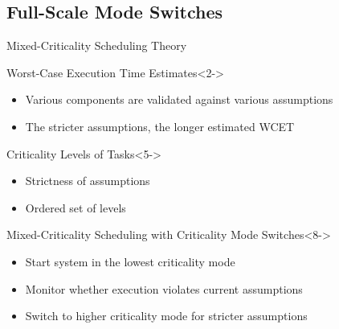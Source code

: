 \subsection{Full-Scale Mode Switches}

\begin{frame}{Mixed-Criticality Scheduling Theory}

\begin{block}{Worst-Case Execution Time Estimates}<2->
\begin{itemize}
    \item<3-> Various components are validated against various assumptions
    \item<4-> The stricter assumptions, the longer estimated WCET
\end{itemize}
\end{block}

\begin{block}{Criticality Levels of Tasks}<5->
\begin{itemize}
    \item<6-> Strictness of assumptions
    \item<7-> Ordered set of levels
\end{itemize}
\end{block}

\begin{block}{Mixed-Criticality Scheduling with Criticality Mode Switches}<8->
\begin{itemize}
    \item<9-> Start system in the lowest criticality mode
    \item<10-> Monitor whether execution violates current assumptions
    \item<11-> Switch to higher criticality mode for stricter assumptions
\end{itemize}
\end{block}

\end{frame}


